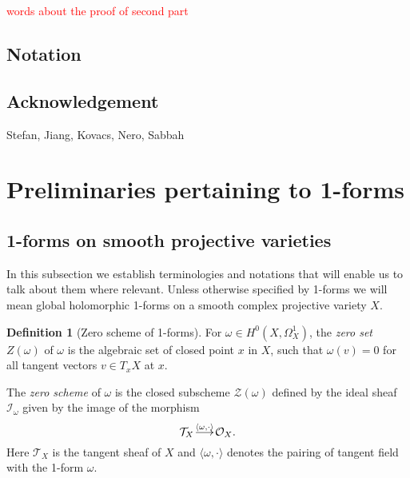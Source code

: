 \documentclass[a4paper,12pt,reqno]{amsart}
\makeatletter
\theoremstyle{plain}
\theoremstyle{definition}
\newtheorem{definition}[theorem]{Definition}
\theoremstyle{remark}
\renewcommand{\longrightarrow}{\xymatrix@1@=15pt{\ar[r]&}}
\newcommand{\sZ}{\mathcal{Z}}
\newcommand{\sorry}[1]{\textcolor{red}{#1}}
\makeatother
\begin{document}
\sorry{words about the proof of second part}








\subsection*{Notation}

































\subsection*{Acknowledgement} 

Stefan, Jiang, Kovacs, Nero, Sabbah

\section{Preliminaries pertaining to 1-forms}

\subsection{1-forms on smooth projective varieties}

In this subsection we establish terminologies and notations that will enable us to talk about them where relevant. Unless otherwise
specified by 1-forms we will mean global holomorphic 1-forms on a smooth complex projective variety $X$.

\begin{definition}[Zero scheme of 1-forms]\label{def:zeroscheme}
For $\omega\in H^0(X, \Omega_X^1)$, the \emph{zero set} $Z(\omega)$ of $\omega$ is the algebraic set of closed point $x$ in $X$, such that $\omega(v)=0$
for all tangent vectors $v\in T_xX$ at $x$. 

The \emph{zero scheme} of $\omega$ is the closed subscheme $\sZ(\omega)$ defined by the ideal sheaf $\mathcal{I}_{\omega}$ given by the image of the morphism 
\[\mathcal{T}_X\overset{\langle\omega, \cdot\rangle}{\longrightarrow} \mathcal{O}_X.\] 
Here $\mathcal{T}_X$ is the tangent sheaf of $X$ and $\langle\omega, \cdot\rangle$ denotes the pairing of tangent field with 
the 1-form $\omega$.
\end{definition}
\end{document}
